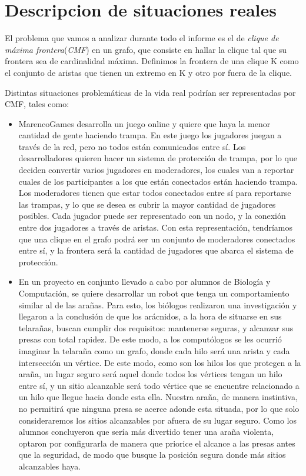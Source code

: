\section{Descripcion de situaciones reales}
El problema que vamos a analizar durante todo el informe es el de \textit{clique de máxima frontera}(\textit{CMF}) en un grafo, que consiste en hallar la clique tal que su frontera sea de cardinalidad máxima. Definimos la frontera de una clique K como el conjunto de aristas que tienen un extremo en K y otro por fuera de la clique.

Distintas situaciones problemáticas de la vida real podrían ser representadas por CMF, tales como:

\begin{itemize}

\item MarencoGames desarrolla un juego online y quiere que haya la menor cantidad de gente haciendo trampa. En este juego los jugadores juegan a través de la red, pero no todos están comunicados entre sí. Los desarrolladores quieren hacer un sistema de protección de trampa, por lo que deciden convertir varios jugadores en moderadores, los cuales van a reportar cuales de los participantes a los que están conectados están haciendo trampa. Los moderadores tienen que estar todos conectados entre sí para reportarse las trampas, y lo que se desea es cubrir la mayor cantidad de jugadores posibles.  Cada jugador puede ser representado con un nodo, y la conexión entre dos jugadores a través de aristas. Con esta representación, tendríamos que una clique en el grafo podrá ser un conjunto de moderadores conectados entre sí, y la frontera será la cantidad de jugadores que abarca el sistema de protección.

\item En un proyecto en conjunto llevado a cabo por alumnos de Biología y Computación, se quiere desarrollar un robot que tenga un comportamiento similar al de las arañas. Para esto, los biólogos realizaron una investigación y llegaron a la conclusión de que los arácnidos, a la hora de situarse en sus telarañas, buscan cumplir dos requisitos: mantenerse seguras, y alcanzar sus presas con total rapidez. De este modo, a los computólogos se les ocurrió imaginar la telaraña como un grafo, donde cada hilo será una arista y cada intersección un vértice. De este modo, como son los hilos los que protegen a la araña, un lugar seguro será aquel donde todos los vértices tengan un hilo entre sí, y un sitio alcanzable será todo vértice que se encuentre relacionado a un hilo que llegue hacia donde esta ella. Nuestra araña, de manera instintiva, no permitirá que ninguna presa se acerce adonde esta situada, por lo que solo consideraremos los sitios alcanzables por afuera de su lugar seguro. Como los alumnos concluyeron que sería más divertido tener una araña violenta, optaron por configurarla de manera que priorice el alcance a las presas antes que la seguridad, de modo que busque la posición segura donde más sitios alcanzables haya.


\end{itemize}
